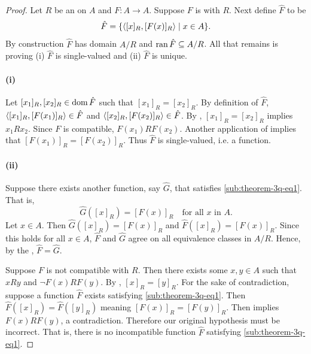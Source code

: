 \documentclass{report}
\begin{document}
  \begin{proof}
    Let $R$ be an  on $A$ and
      $F \colon A \rightarrow A$.
    Suppose $F$ is  with $R$.
    Next define  $\hat{F}$ to be
      $$\hat{F} = \{\left< [x]_R, [F(x)]_R \right> \mid x \in A\}.$$
    By construction $\hat{F}$ has domain $A / R$ and
      $\mathop{\text{ran}}{\hat{F}} \subseteq A / R$.
    All that remains is proving (i) $\hat{F}$ is single-valued and (ii)
      $\hat{F}$ is unique.

    \paragraph{(i)}%

      Let $[x_1]_R, [x_2]_R \in \mathop{\text{dom}}{\hat{F}}$ such that $[x_1]_R = [x_2]_R$.
      By definition of $\hat{F}$, $\left< [x_1]_R, [F(x_1)]_R \right> \in \hat{F}$
        and $\left< [x_2]_R, [F(x_2)]_R \right> \in \hat{F}$.
      By , $[x_1]_R = [x_2]_R$ implies $x_1Rx_2$.
      Since $F$ is compatible, $F(x_1)RF(x_2)$.
      Another application of  implies that
        $[F(x_1)]_R = [F(x_2)]_R$.
      Thus $\hat{F}$ is single-valued, i.e. a function.

    \paragraph{(ii)}%

      Suppose there exists another function, say $\hat{G}$, that satisfies
        \eqref{sub:theorem-3q-eq1}.
      That is,
        $$\hat{G}([x]_R) = [F(x)]_R \quad\text{for all } x \text{ in } A.$$
      Let $x \in A$.
      Then $\hat{G}([x]_R) = [F(x)]_R$ and $\hat{F}([x]_R) = [F(x)]_R$.
      Since this holds for all $x \in A$, $\hat{F}$ and $\hat{G}$ agree on all
        equivalence classes in $A / R$.
      Hence, by the , $\hat{F} = \hat{G}$.

    \suitdivider

    \noindent
    Suppose $F$ is not compatible with $R$.
    Then there exists some $x, y \in A$ such that $xRy$ and $\neg F(x)RF(y)$.
    By , $[x]_R = [y]_R$.
    For the sake of contradiction, suppose a function $\hat{F}$ exists
      satisfying \eqref{sub:theorem-3q-eq1}.
    Then $\hat{F}([x]_R) = \hat{F}([y]_R)$ meaning $[F(x)]_R = [F(y)]_R$.
    Then  implies $F(x)RF(y)$, a contradiction.
    Therefore our original hypothesis must be incorrect.
    That is, there is no incompatible function $\hat{F}$ satisfying
      \eqref{sub:theorem-3q-eq1}.
  \end{proof}
\end{document}
